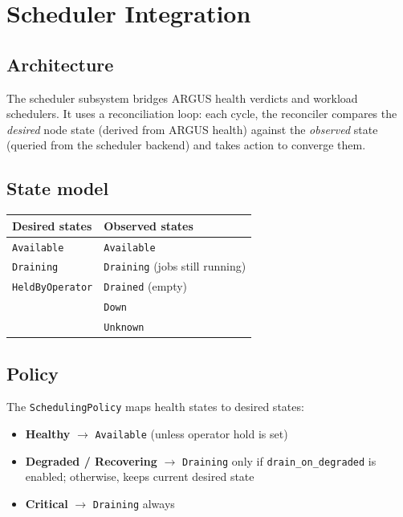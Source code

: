 \documentclass[11pt]{article}
\begin{document}
\section{Scheduler Integration}
\label{sec:scheduler}

\subsection{Architecture}

The scheduler subsystem bridges ARGUS health verdicts and workload
schedulers. It uses a reconciliation loop: each cycle, the reconciler
compares the \emph{desired} node state (derived from ARGUS health) against
the \emph{observed} state (queried from the scheduler backend) and takes
action to converge them.

\subsection{State model}

\begin{center}
\small
\begin{tabular}{ll}
\toprule
Desired states & Observed states \\
\midrule
\texttt{Available}       & \texttt{Available} \\
\texttt{Draining}        & \texttt{Draining} (jobs still running) \\
\texttt{HeldByOperator}  & \texttt{Drained} (empty) \\
                          & \texttt{Down} \\
                          & \texttt{Unknown} \\
\bottomrule
\end{tabular}
\end{center}

\subsection{Policy}

The \texttt{SchedulingPolicy} maps health states to desired states:

\begin{itemize}[nosep]
  \item \textbf{Healthy} $\rightarrow$ \texttt{Available} (unless operator hold is set)
  \item \textbf{Degraded / Recovering} $\rightarrow$ \texttt{Draining} only if
        \texttt{drain\_on\_degraded} is enabled; otherwise, keeps current desired state
  \item \textbf{Critical} $\rightarrow$ \texttt{Draining} always
\end{itemize}
\end{document}
